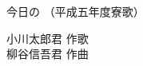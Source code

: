 \documentclass[10pt,b5j]{tarticle} %
\begin{document}
\begin{minipage}[c]{0.7\hsize} %
    \begin{center}
        {\LARGE
            今日の %
        }
        {\small 
            （平成五年度寮歌） %
        }
    \end{center}
\end{minipage}
\begin{minipage}[c]{0.3\hsize} %
    \begin{flushright} %
        小川太郎君 作歌\\柳谷信吾君 作曲 %
    \end{flushright}
\end{minipage}
\end{document}

